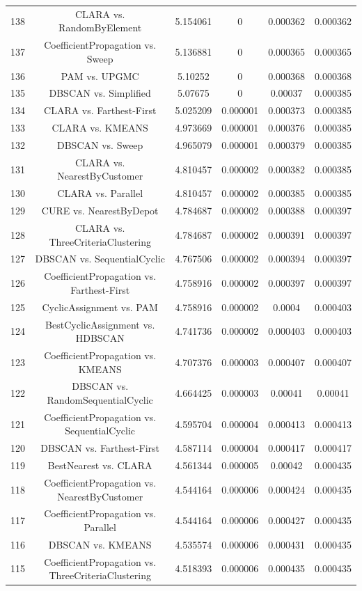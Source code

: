 \documentclass[a4paper,10pt]{article}
\begin{document}
\begin{landscape}
\begin{table}[!htp]
\begin{tabular}{cccccc}
138&CLARA vs. RandomByElement&5.154061&0&0.000362&0.000362\\
137&CoefficientPropagation vs. Sweep&5.136881&0&0.000365&0.000365\\
136&PAM vs. UPGMC&5.10252&0&0.000368&0.000368\\
135&DBSCAN vs. Simplified&5.07675&0&0.00037&0.000385\\
134&CLARA vs. Farthest-First&5.025209&0.000001&0.000373&0.000385\\
133&CLARA vs. KMEANS&4.973669&0.000001&0.000376&0.000385\\
132&DBSCAN vs. Sweep&4.965079&0.000001&0.000379&0.000385\\
131&CLARA vs. NearestByCustomer&4.810457&0.000002&0.000382&0.000385\\
130&CLARA vs. Parallel&4.810457&0.000002&0.000385&0.000385\\
129&CURE vs. NearestByDepot&4.784687&0.000002&0.000388&0.000397\\
128&CLARA vs. ThreeCriteriaClustering&4.784687&0.000002&0.000391&0.000397\\
127&DBSCAN vs. SequentialCyclic&4.767506&0.000002&0.000394&0.000397\\
126&CoefficientPropagation vs. Farthest-First&4.758916&0.000002&0.000397&0.000397\\
125&CyclicAssignment vs. PAM&4.758916&0.000002&0.0004&0.000403\\
124&BestCyclicAssignment vs. HDBSCAN&4.741736&0.000002&0.000403&0.000403\\
123&CoefficientPropagation vs. KMEANS&4.707376&0.000003&0.000407&0.000407\\
122&DBSCAN vs. RandomSequentialCyclic&4.664425&0.000003&0.00041&0.00041\\
121&CoefficientPropagation vs. SequentialCyclic&4.595704&0.000004&0.000413&0.000413\\
120&DBSCAN vs. Farthest-First&4.587114&0.000004&0.000417&0.000417\\
119&BestNearest vs. CLARA&4.561344&0.000005&0.00042&0.000435\\
118&CoefficientPropagation vs. NearestByCustomer&4.544164&0.000006&0.000424&0.000435\\
117&CoefficientPropagation vs. Parallel&4.544164&0.000006&0.000427&0.000435\\
116&DBSCAN vs. KMEANS&4.535574&0.000006&0.000431&0.000435\\
115&CoefficientPropagation vs. ThreeCriteriaClustering&4.518393&0.000006&0.000435&0.000435\\

\end{tabular}
\end{table}
\end{landscape}
\end{document}
